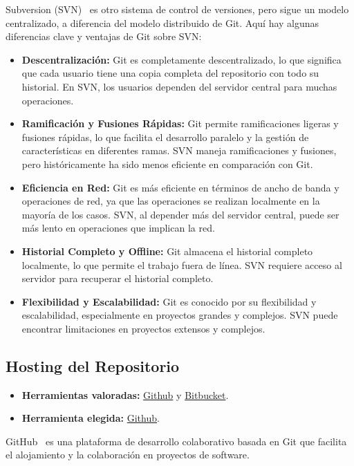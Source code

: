 Subversion (SVN)~\cite{misc:SVN} es otro sistema de control de versiones, pero sigue un modelo centralizado, a diferencia del modelo distribuido de Git. Aquí hay algunas diferencias clave y ventajas de Git sobre SVN:
\begin{itemize}
	\item \textbf{Descentralización:}
Git es completamente descentralizado, lo que significa que cada usuario tiene una copia completa del repositorio con todo su historial. En SVN, los usuarios dependen del servidor central para muchas operaciones.

\item \textbf{Ramificación y Fusiones Rápidas:}
Git permite ramificaciones ligeras y fusiones rápidas, lo que facilita el desarrollo paralelo y la gestión de características en diferentes ramas. SVN maneja ramificaciones y fusiones, pero históricamente ha sido menos eficiente en comparación con Git.

\item \textbf{Eficiencia en Red:}
Git es más eficiente en términos de ancho de banda y operaciones de red, ya que las operaciones se realizan localmente en la mayoría de los casos. SVN, al depender más del servidor central, puede ser más lento en operaciones que implican la red.

\item \textbf{Historial Completo y Offline:}
Git almacena el historial completo localmente, lo que permite el trabajo fuera de línea. SVN requiere acceso al servidor para recuperar el historial completo.

\item \textbf{Flexibilidad y Escalabilidad:}
Git es conocido por su flexibilidad y escalabilidad, especialmente en proyectos grandes y complejos. SVN puede encontrar limitaciones en proyectos extensos y complejos.
\end{itemize}


\subsection{Hosting del Repositorio}
\begin{itemize}
    \item \textbf{Herramientas valoradas:} \href{https://github.com/}{Github} y \href{https://bitbucket.org/product/}{Bitbucket}.
    \item \textbf{Herramienta elegida:} \href{https://github.com/}{Github}.
\end{itemize}
GitHub~\cite{misc:Github} es una plataforma de desarrollo colaborativo basada en Git que facilita el alojamiento y la colaboración en proyectos de software. 

